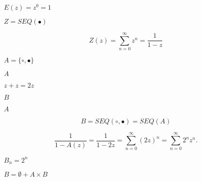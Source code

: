 \documentclass[10pt]{book}
\begin{document}
\begin{mdSnippets}
\begin{mdInlineSnippet}
$E(z) = z^0 = 1$\end{mdInlineSnippet}%
\begin{mdInlineSnippet}[1f11b7ae03fe41651d94de141afcc84a]%
$Z=SEQ(\bullet)$\end{mdInlineSnippet}%
\begin{mdDisplaySnippet}%
\[%
Z(z) = \sum_{n=0}^\infty  z^n = \frac{1}{1 - z}
\]%
\end{mdDisplaySnippet}%
\begin{mdInlineSnippet}[fca55d2328dc748f13ca41b98911074e]%
$A = \{\circ,\bullet\}$\end{mdInlineSnippet}%
\begin{mdInlineSnippet}[7fc56270e7a70fa81a5935b72eacbe29]%
$A$\end{mdInlineSnippet}%
\begin{mdInlineSnippet}%
$z + z=2z$\end{mdInlineSnippet}%
\begin{mdInlineSnippet}%
$B$\end{mdInlineSnippet}%
\begin{mdInlineSnippet}[7fc56270e7a70fa81a5935b72eacbe29]%
$A$\end{mdInlineSnippet}%
\begin{mdDisplaySnippet}[78d6c064ae66b0f4dfe88cc53eb7691d]%
\[%
B = SEQ(\circ,\bullet)=SEQ(A)
\]%
\end{mdDisplaySnippet}%
\begin{mdDisplaySnippet}%
\[%
\frac{1}{1-A(z)}=\frac{1}{1-2z} = \sum_{n=0}^\infty (2z)^n=\sum_{n=0}^\infty 2^nz^n.
\]%
\end{mdDisplaySnippet}%
\begin{mdInlineSnippet}[40e5fb314fd79f999e5c45f397317655]%
$B_n=2^n$\end{mdInlineSnippet}%
\begin{mdInlineSnippet}[2e316beb75845dc29e752d522d1c77c8]%
$B = \emptyset + A \times B$\end{mdInlineSnippet}%
\begin{mdDisplaySnippet}[3359a0ee5a38412f5b8a9a46108a25b2]%

\end{mdDisplaySnippet}
\end{mdSnippets}
\end{document}
